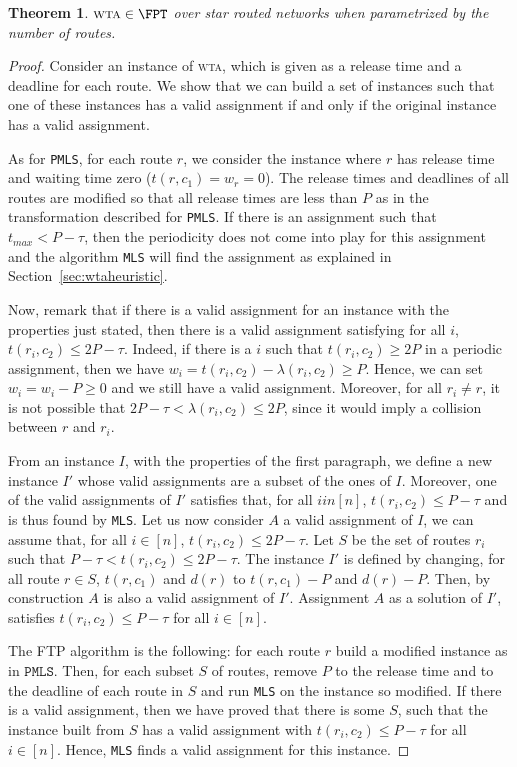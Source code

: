 \documentclass[a4paper,10pt]{journal}
\newcommand\MLS{\texttt{MLS}\xspace}
\newcommand\PMLS{\texttt{PMLS}\xspace}
\newtheorem{theorem}{Theorem}
\newcommand\wta{\textsc{wta}\xspace}
\begin{document}
\begin{theorem}\label{th:braFPT}
$\wta \in \FPT$ over star routed networks when parametrized by the number of routes.
\end{theorem}
\begin{proof}
 Consider an instance of \wta, which is given as a release time and a deadline for each route.
 We show that we can build a set of instances such that one of these instances has a valid assignment if and only if the original instance has a valid assignment.

  As for \PMLS, for each route $r$, we consider the instance where $r$ has release time and waiting time zero ($t(r,c_1) = w_r = 0$). The release times and deadlines of all routes are modified so that all release times are less than $P$ as in the transformation described for \PMLS. If there is an assignment such that $t_{max} < P-\tau$, then the periodicity does not come into play for this assignment and the algorithm \MLS will find the assignment as explained in Section~\ref{sec:wtaheuristic}.

 Now, remark that if there is a valid assignment for an instance with the properties just stated,
 then there is a valid assignment satisfying for all $i$, $t(r_i,c_2) \leq 2P - \tau$.  
 Indeed, if there is a $i$ such that $t(r_i,c_2) \geq 2P$ in a periodic assignment, then we have 
 $w_i = t(r_i,c_2) - \lambda(r_i,c_2) \geq P$. Hence, we can set $w_i = w_i -P \geq 0$ and we still have 
 a valid assignment. Moreover, for all $r_i \neq r$, it is not possible that $2P-\tau < \lambda(r_i,c_2) \leq 2P$, since it would imply a collision between $r$ and $r_i$.
 

From an instance $I$, with the properties of the first paragraph, we define a new instance $I'$ whose valid assignments are a subset of the ones of $I$. Moreover, one of the valid assignments of $I'$ satisfies that, for all $i in [n]$, $t(r_i,c_2) \leq P - \tau$ and is thus found by \MLS. 
Let us now consider $A$ a valid assignment of $I$, we can assume that, for all $i \in [n]$, $t(r_i,c_2) \leq 2P - \tau$. Let $S$ be the set of routes $r_i$ such that  $P - \tau < t(r_i,c_2) \leq 2P - \tau$. The instance $I'$ is defined by changing, for all route $r \in S$, $t(r,c_1)$ and $d(r)$ to $t(r,c_1) - P$ and $d(r) - P$. Then, by construction $A$ is also a valid assignment of $I'$. Assignment $A$ as a solution of $I'$, satisfies $t(r_i,c_2) \leq P - \tau$ for all $i\in [n]$. 

The FTP algorithm is the following: for each route $r$ build a modified instance as in $\PMLS$.
Then, for each subset $S$ of routes, remove $P$ to the release time and to the deadline of each route in $S$ and run \MLS on the instance so modified. If there is a valid assignment, then we have proved that there is some $S$, such that the instance built from $S$ has a valid assignment with $t(r_i,c_2) \leq P - \tau$ for all $i\in [n]$. Hence, \MLS finds a valid assignment for this instance.
\end{proof}
\end{document}
